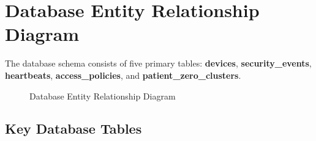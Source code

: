 \documentclass[12pt,a4paper]{report}
\begin{document}
\section{Database Entity Relationship Diagram}

The database schema consists of five primary tables: \textbf{devices}, \textbf{security\_events}, \textbf{heartbeats}, \textbf{access\_policies}, and \textbf{patient\_zero\_clusters}.

\begin{figure}[H]
  \centering
  \caption{Database Entity Relationship Diagram}
  \label{fig:erd}
\end{figure}

\subsection*{Key Database Tables}
\end{document}
